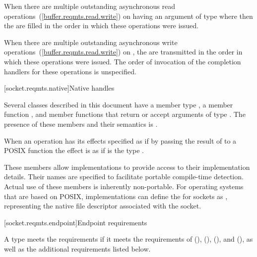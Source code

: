 \pnum
When there are multiple outstanding asynchronous read operations~(\ref{buffer.reqmts.read.write}) on  having an argument  of type  where  then the  are filled in the order in which these operations were issued.

\pnum
When there are multiple outstanding asynchronous write operations~(\ref{buffer.reqmts.read.write}) on , the  are transmitted in the order in which these operations were issued. The order of invocation of the completion handlers for these operations is unspecified.



%
[socket.reqmts.native]{Native handles}

\pnum
Several classes described in this document have a member type , a member function , and member functions that return or accept arguments of type . The presence of these members and their semantics is
.

\pnum
When an operation has its effects specified as if by passing the result of 
to a POSIX function the effect is as if  is the type .

\pnum
\begin{note} These members allow implementations to provide access to their implementation details. Their names are specified to facilitate portable compile-time detection. Actual use of these members is inherently non-portable. For operating systems that are based on POSIX, implementations can define the  for sockets as , representing the native file descriptor associated with the socket. \end{note}



[socket.reqmts.endpoint]{Endpoint requirements}

\pnum
A type  meets the  requirements if it meets the requirements of  (),  (),  (), and  (), as well as the additional requirements listed below.

